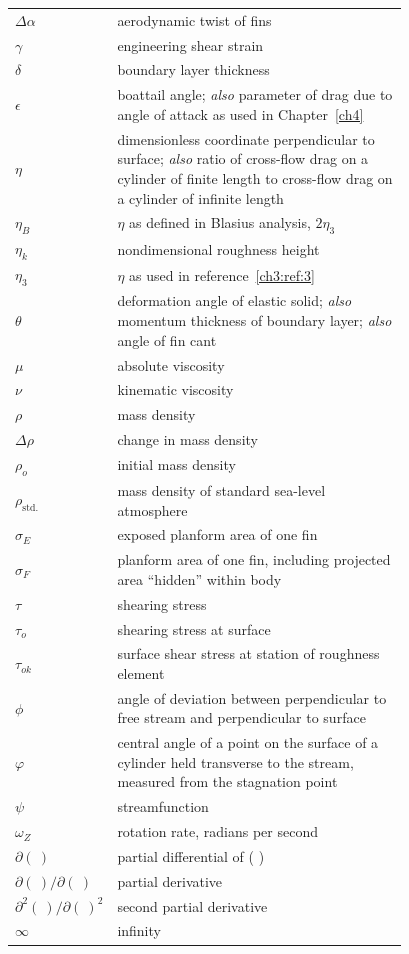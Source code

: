 \begin{longtable}{@{}l p{0.78\linewidth}@{}}
$\Delta\alpha$ & aerodynamic twist of fins \\
$\gamma$ & engineering shear strain \\
$\delta$ & boundary layer thickness \\
$\epsilon$ & boattail angle; \emph{also} parameter of drag due to angle of attack as used in Chapter~\ref{ch4} \\
$\eta$ & dimensionless coordinate perpendicular to surface; \emph{also} ratio of cross-flow drag on a cylinder of finite length to cross-flow drag on a cylinder of infinite length \\
$\eta_B$ & $\eta$ as defined in Blasius analysis, $2\eta_3$ \\
$\eta_k$ & nondimensional roughness height \\
$\eta_3$ & $\eta$ as used in reference~\ref{ch3:ref:3} \\
$\theta$ & deformation angle of elastic solid; \emph{also} momentum thickness of boundary layer; \emph{also} angle of fin cant \\
$\mu$ & absolute viscosity \\
$\nu$ & kinematic viscosity \\
$\rho$ & mass density \\
$\Delta\rho$ & change in mass density \\
$\rho_o$ & initial mass density \\
$\rho_{\mathrm{std.}}$ & mass density of standard sea-level atmosphere \\
$\sigma_E$ & exposed planform area of one fin \\
$\sigma_F$ & planform area of one fin, including projected area ``hidden'' within body \\
$\tau$ & shearing stress \\
$\tau_o$ & shearing stress at surface \\
$\tau_{ok}$ & surface shear stress at station of roughness element \\
$\phi$ & angle of deviation between perpendicular to free stream and perpendicular to surface \\
$\varphi$ & central angle of a point on the surface of a cylinder held transverse to the stream, measured from the stagnation point \\
$\psi$ & streamfunction \\
$\omega_Z$ & rotation rate, radians per second \\
$\partial(\ )$ & partial differential of ( ) \\
$\partial(\ )/\partial(\ )$ & partial derivative \\
$\partial^{2}(\ )/\partial(\ )^{2}$ & second partial derivative \\
$\infty$ & infinity \\
\end{longtable}
\addtocounter{table}{-1}%
